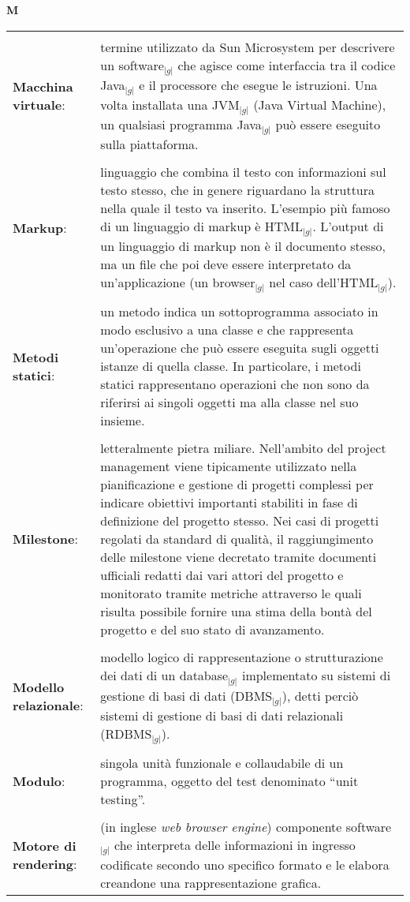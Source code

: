 \hfill\Huge{\textbf{M}}\\
\normalsize
	\begin{longtable}{p{} p{}} 
	    \toprule
	    \\
	    \textbf{Macchina virtuale}:		&	termine utilizzato da Sun Microsystem per descrivere un software$_{|g|}$ che agisce come interfaccia tra il codice Java$_{|g|}$ e il processore che esegue le istruzioni. Una volta installata una JVM$_{|g|}$ (Java Virtual Machine), un qualsiasi programma Java$_{|g|}$ 
							può essere eseguito sulla piattaforma.\\
	    \\
	    \textbf{Markup}:			&	linguaggio che combina il testo con informazioni sul testo stesso, che in genere riguardano la struttura nella quale il testo va inserito. L’esempio più famoso di un linguaggio di markup è HTML$_{|g|}$. L’output di un linguaggio 
							di markup non è il documento stesso, ma un file che poi deve essere interpretato da un’applicazione (un browser$_{|g|}$ nel caso dell’HTML$_{|g|}$).\\
	    \\
	    \textbf{Metodi statici}: 		&	un metodo indica un sottoprogramma associato in modo esclusivo a una classe e che rappresenta un'operazione che può essere eseguita sugli oggetti istanze di quella classe. In particolare, i metodi statici rappresentano operazioni che non sono da riferirsi ai 
							singoli oggetti ma alla classe nel suo insieme.\\
	    \\
	    \textbf{Milestone}:			&	letteralmente pietra miliare. Nell’ambito del project management viene tipicamente utilizzato nella pianificazione e gestione di progetti complessi per indicare obiettivi importanti stabiliti in fase di definizione del progetto stesso. Nei casi di progetti 
							regolati da standard di qualità, il raggiungimento delle milestone viene decretato tramite documenti ufficiali redatti dai vari attori del progetto e monitorato tramite metriche attraverso le quali risulta possibile fornire una stima della bontà del progetto 
							e del suo stato di avanzamento.\\
	    \\
	    \textbf{Modello}\newline
	    \textbf{relazionale}:		&	modello logico di rappresentazione o strutturazione dei dati di un database$_{|g|}$ implementato su sistemi di gestione di basi di dati (DBMS$_{|g|}$), detti perciò sistemi di gestione di basi di dati relazionali (RDBMS$_{|g|}$).\\
	    \\
	    \textbf{Modulo}:			&	singola unità funzionale e collaudabile di un programma, oggetto del test denominato “unit testing”.\\
	    \\
	    \textbf{Motore di} \newline 
	    \textbf{ rendering}:		&	(in inglese \textit{web browser engine}) componente software$_{|g|}$ che interpreta delle informazioni in ingresso codificate secondo uno specifico formato e le elabora creandone una rappresentazione grafica.\\
	\end{longtable}
\newpage

